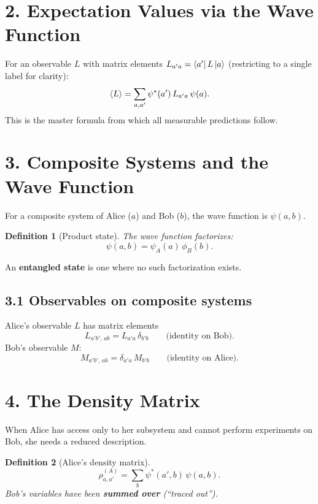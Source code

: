 \documentclass[12pt,a4paper]{article}
\newtheorem{definition}{Definition}
\begin{document}
\section{2. Expectation Values via the Wave Function}

For an observable $L$ with matrix elements $L_{a'a}=\bra{a'}L\ket{a}$ (restricting to a single label for clarity):
\[
    \expval{L} = \sum_{a,a'} \psi^*(a')\,L_{a'a}\,\psi(a).
\]
This is the master formula from which all measurable predictions follow.

\section{3. Composite Systems and the Wave Function}

For a composite system of Alice ($a$) and Bob ($b$), the wave function is $\psi(a,b)$.

\begin{definition}[Product state]
The wave function factorizes:
\[
    \psi(a,b) = \psi_A(a)\,\phi_B(b).
\]
\end{definition}

An \textbf{entangled state} is one where no such factorization exists.

\subsection{3.1 Observables on composite systems}
Alice's observable $L$ has matrix elements
\[
    L_{a'b',\,ab} = L_{a'a}\,\delta_{b'b} \qquad\text{(identity on Bob)}.
\]
Bob's observable $M$:
\[
    M_{a'b',\,ab} = \delta_{a'a}\,M_{b'b} \qquad\text{(identity on Alice)}.
\]

\section{4. The Density Matrix}

When Alice has access only to her subsystem and cannot perform experiments on Bob, she needs a reduced description.

\begin{definition}[Alice's density matrix]
\[
    \boxed{\rho^{(A)}_{a,a'} = \sum_b \psi^*(a',b)\,\psi(a,b).}
\]
Bob's variables have been \textbf{summed over} (``traced out'').
\end{definition}
\end{document}
